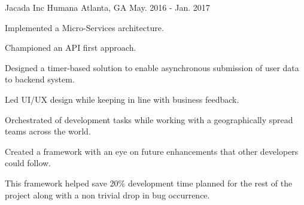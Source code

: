 \begin{cventries}
\cventry
{Jacada Inc} %
{Humana} %
{Atlanta, GA} %
{May. 2016 - Jan. 2017} %
{
  \begin{cvitems} %
    \item {Implemented a Micro-Services architecture.}
    \item {Championed an API first approach.}
    \item {Designed a timer-based solution to enable asynchronous submission of user data to backend system.}
    \item {Led UI/UX design while keeping in line with business feedback.}
    \item {Orchestrated of development tasks while working with a geographically spread teams across the world.}
    \item {Created a framework with an eye on future enhancements that other developers could follow.}
    \item {This framework helped save 20\% development time planned for the rest of the project along with a non trivial drop in bug occurrence.}
  \end{cvitems}
}

\end{cventries}
